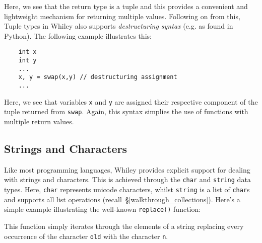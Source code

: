 

Here, we see that the return type is a tuple and this provides a convenient and lightweight mechanism for returning multiple values.  Following on from this, Tuple types in Whiley also supports {\em destructuring syntax} (e.g. as found in Python).  The following example illustrates this:

\begin{lstlisting}
    int x
    int y
    ...
    x, y = swap(x,y) // destructuring assignment
    ...        
\end{lstlisting}

Here, we see that variables \lstinline{x} and \lstinline{y} are assigned their respective component of the tuple returned from \lstinline{swap}.  Again, this syntax simplies the use of functions with multiple return values.

\subsection{Strings and Characters}

Like most programming languages, Whiley provides explicit support for dealing with strings and characters.  This is achieved through the \lstinline{char} and \lstinline{string} data types.  Here, \lstinline{char} represents unicode characters, whilst \lstinline{string} is a list of \lstinline{char}s and supports all list operations (recall~\S\ref{walkthrough_collections}).  Here's a simple example illustrating the well-known \lstinline{replace()} function:



This function simply iterates through the elements of a string replacing every occurrence of the character \lstinline{old} with the character \lstinline{n}.